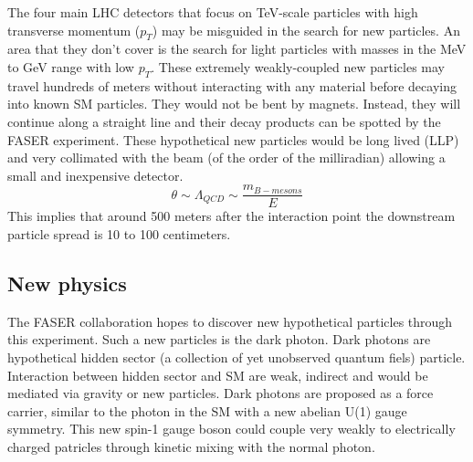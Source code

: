 The four main LHC detectors that focus on TeV-scale particles with high transverse momentum ($p_{T}$) may be misguided in the search for new particles. An area that they don't cover is the search for light particles with masses in the MeV to GeV range with low $p_{T}$. These extremely weakly-coupled new particles may travel hundreds of meters without interacting with any material before decaying into known SM particles. They would not be bent by magnets. Instead, they will continue along a straight line and their decay products can be spotted by the FASER experiment. These hypothetical new particles would be long lived (LLP) and very collimated with the beam (of the order of the milliradian) allowing a small and inexpensive detector.
\[
\theta\sim\Lambda_{QCD}\sim\frac{m_{B-mesons}}{E}
\]
This implies that around 500 meters after the interaction point the downstream particle spread is 10 to 100 centimeters.

\subsection{New physics}

The FASER collaboration hopes to discover new hypothetical particles through this experiment. Such a new particles is the dark photon. Dark photons are hypothetical hidden sector (a collection of yet unobserved quantum fiels) particle. Interaction between hidden sector and SM are weak, indirect and would be mediated via gravity or new particles. Dark photons are proposed as a force carrier, similar to the photon in the SM with a new abelian U(1) gauge symmetry. This new spin-1 gauge boson could couple very weakly to electrically charged patricles through kinetic mixing with the normal photon. \cite{noauthor_dark_2019}

